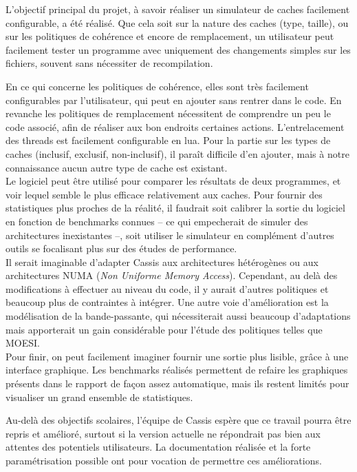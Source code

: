 L'objectif principal du projet, à savoir réaliser un simulateur de caches facilement configurable, a été réalisé. Que cela soit sur la nature des caches (type, taille), ou sur les politiques de cohérence et encore de remplacement, un utilisateur peut facilement tester un programme avec uniquement des changements simples sur les fichiers, souvent sans nécessiter de recompilation.

En ce qui concerne les politiques de cohérence, elles sont très facilement configurables par l'utilisateur, qui peut en ajouter sans rentrer dans le code. En revanche les politiques de remplacement nécessitent de comprendre un peu le code associé, afin de réaliser aux bon endroits certaines actions. L'entrelacement des threads est facilement configurable en lua. Pour la partie sur les types de caches (inclusif, exclusif, non-inclusif), il paraît difficile d'en ajouter, mais à notre connaissance aucun autre type de cache est existant.\\

Le logiciel peut être utilisé pour comparer les résultats de deux programmes, et voir lequel semble le plus efficace relativement aux caches. Pour fournir des statistiques plus proches de la réalité, il faudrait soit calibrer la sortie du logiciel en fonction de benchmarks connues -- ce qui empecherait de simuler des architectures inexistantes --, soit utiliser le simulateur en complément d'autres outils se focalisant plus sur des études de performance.\\

Il serait imaginable d'adapter \textsf{Cassis} aux architectures hétérogènes ou aux architectures NUMA (\emph{Non Uniforme Memory Access}). Cependant, au delà des modifications à effectuer au niveau du code, il y aurait d'autres politiques et beaucoup plus de contraintes à intégrer. Une autre voie d'amélioration est la modélisation de la bande-passante, qui nécessiterait aussi beaucoup d'adaptations mais apporterait un gain considérable pour l'étude des politiques telles que MOESI.\\

Pour finir, on peut facilement imaginer fournir une sortie plus lisible, grâce à une interface graphique. Les benchmarks réalisés permettent de refaire les graphiques présents dans le rapport de façon assez automatique, mais ils restent limités pour visualiser un grand ensemble de statistiques.

Au-delà des objectifs scolaires, l'équipe de \textsf{Cassis} espère que ce travail pourra être repris et amélioré, surtout si la version actuelle ne répondrait pas bien aux attentes des potentiels utilisateurs. La documentation réalisée et la forte paramétrisation possible ont pour vocation de permettre ces améliorations.


